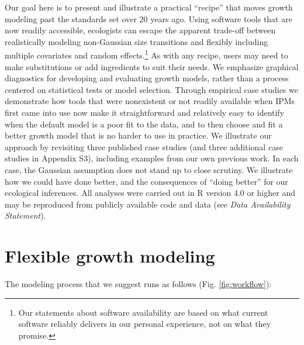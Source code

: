 \documentclass[12pt]{article}
\begin{document}
\begin{spacing}{1.9}
Our goal here is to present and illustrate a practical ``recipe'' that moves growth modeling past the standards set over 20 years ago. 
Using software tools that are now readily accessible, ecologists can escape the apparent trade-off between realistically modeling non-Gaussian size transitions and flexibly including multiple covariates and random effects.\footnote{Our statements about software availability are based on what current software reliably delivers in our personal experience, not on what they promise.} 
As with any recipe, users may need to make substitutions or add ingredients to suit their needs. 
We emphasize graphical diagnostics for developing and evaluating growth models, rather than a process centered on statistical tests or model selection. 
Through empirical case studies we demonstrate how tools that were nonexistent or not readily available when IPMs first came into use now make it straightforward and relatively easy to identify when the default model is a poor fit to the data, and to then choose and fit a better growth model that is no harder to use in practice. 
We illustrate our approach by revisiting three published case studies (and three additional case studies in Appendix S3), including examples from our own previous work.
In each case, the Gaussian assumption does not stand up to close scrutiny. 
We illustrate how we could have done better, and the consequences of ``doing better'' for our ecological inferences. 
All analyses were carried out in R \citep{r-core} version 4.0 or higher and may be reproduced from publicly available code and data (see \emph{Data Availability Statement}). 

\section{Flexible growth modeling}
The modeling process that we suggest runs as follows (Fig. \ref{fig:workflow}):

\end{spacing}
\end{document}
